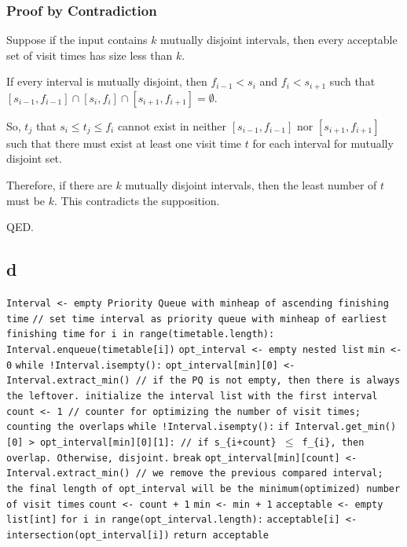 \documentclass[11pt]{article}
\begin{document}
\subsubsection{Proof by Contradiction}
Suppose if the input contains $k$ mutually disjoint intervals, then every acceptable set of visit times has size less than $k$.

If every interval is mutually disjoint, then $f_{i-1} < s_i$ and $f_i < s_{i+1}$ such that $[s_{i-1}, f_{i-1}] \cap [s_i, f_i] \cap [s_{i+1}, f_{i+1}] = \emptyset$.

So, $t_j$ that $s_i \le t_j \le f_i$ cannot exist in neither $[s_{i-1},f_{i-1}]$ nor $[s_{i+1}, f_{i+1}]$ such that there must exist at least one visit time $t$ for each interval for mutually disjoint set.

Therefore, if there are $k$ mutually disjoint intervals, then the least number of $t$ must be $k$. This contradicts the supposition.

QED.


\subsection{d}
\begin{algorithm}[H]
\small
\SetAlgoNoEnd
\DontPrintSemicolon
\caption{JFS(timetable: list[list[int,int]]) $\to$ list[int]}
\texttt{Interval <- empty Priority Queue with minheap of ascending finishing time}\;
\BlankLine
\texttt{// set time interval as priority queue with minheap of earliest finishing time}\;
\texttt{for i in range(timetable.length):}\;
\Indp
\texttt{Interval.enqueue(timetable[i])}\;
\BlankLine
\Indm
\texttt{opt\_interval <- empty nested list}\;
\texttt{min <- 0}\;
\texttt{while !Interval.isempty():}\;
\Indp
\texttt{opt\_interval[min][0] <- Interval.extract\_min() // if the PQ is not empty, then there is always the leftover. initialize the interval list with the first interval}\;
\texttt{count <- 1 // counter for optimizing the number of visit times; counting the overlaps}\;
\BlankLine
\texttt{while !Interval.isempty():}\;
\Indp
\texttt{if Interval.get\_min()[0] > opt\_interval[min][0][1]: // if s\_\{i+count\} \ensuremath{\le} f\_\{i\}, then overlap. Otherwise, disjoint.}\;
\Indp
\texttt{break}\;
\Indm
\texttt{opt\_interval[min][count] <- Interval.extract\_min() // we remove the previous compared interval; the final length of opt\_interval will be the minimum(optimized) number of visit times}\;
\texttt{count <- count + 1}\;
\Indm
\texttt{min <- min + 1}\;
\BlankLine
\Indm
\texttt{acceptable <- empty list[int]}\;
\texttt{for i in range(opt\_interval.length):}\;
\Indp
\texttt{acceptable[i] <- intersection(opt\_interval[i])}\;
\Indm
\texttt{return acceptable}\;
\BlankLine
\end{algorithm}
\end{document}
